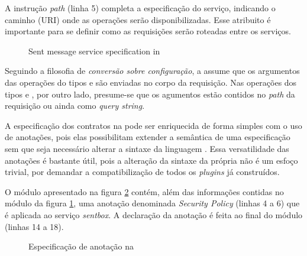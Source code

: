 A instrução \emph{path} (linha 5) completa a especificação do serviço, indicando
o caminho (URI) onde as operações serão disponibilizadas. Esse atribuito é importante para se definir
como as requisições serão roteadas entre os serviços.

\vspace{6mm}

\begin{figure}[htb]
\begin{small}

\end{small}
\caption{Sent message service specification in \neoidl}
\label{lst:sentmessage-neo}
\end{figure}

Seguindo a filosofia de \emph{conversão sobre configuração}, a \neoidl{} assume
que os argumentos das operações do tipos  e  são
enviadas no corpo da requisição. Nas operações dos tipos  e
, por outro lado, presume-se que os agumentos estão contidos no \emph{path} da requisição ou ainda
como \textit{query string}.

A especificação dos contratos na \neoidl{} pode ser enriquecida de forma simples
com o uso de anotações, pois elas possibilitam extender a semântica
de uma especificação sem que seja necessário alterar a sintaxe da
linguagem \neoidl{}. Essa versatilidade das anotações é bastante útil, pois a
alteração da sintaxe da própria \neoidl{} não é um esfoço trivial, por demandar
a compatibilização de todos os \textit{plugins} já construídos.

O módulo apresentado na figura \ref{lst:annotationNeoIDL} contém, além das
informações contidas no módulo da figura \ref{lst:sentmessage-neo}, uma anotação
denominada \emph{Security Policy} (linhas 4 a 6) que é aplicada ao serviço
\emph{sentbox}.
A declaração da anotação é feita ao final do módulo (linhas 14 a 18).

\vspace{6mm}
 
\begin{figure}[htb]
\begin{small}

\vspace{-.5cm}
\end{small}
\caption{Especificação de anotação na \neoidl{}}
\label{lst:annotationNeoIDL}
\end{figure}

